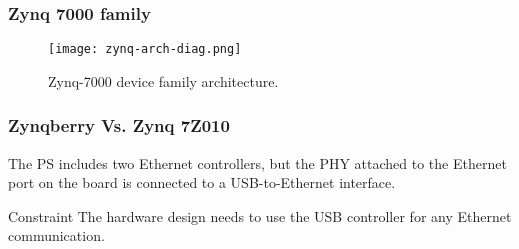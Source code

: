 \begin{frame}
	\frametitle{Zynq 7000 family}
	\begin{figure}
		\texttt{[image: zynq-arch-diag.png]}
		\caption{Zynq-7000 device family architecture.}\label{fig:zynq-arch-diag}
	\end{figure}
\end{frame}

\begin{frame}
	\frametitle{Zynqberry Vs. Zynq 7Z010}
	The PS includes two Ethernet controllers, but the PHY attached to the Ethernet port on the board is connected to a USB-to-Ethernet interface.
	\vfill
	\begin{alertblock}{Constraint}
		The hardware design needs to use the USB controller for any Ethernet communication.
	\end{alertblock}
\end{frame}